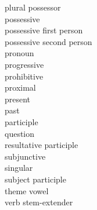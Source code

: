 \begin{multicols}{2}
\begin{tabbing}
\plposs \> plural possessor\\
\poss \> possessive\\
\possFsg \> possessive first person\\
\possSsg \> possessive second person\\
\pro \> pronoun\\
\prog \> progressive\\
\proh \> prohibitive\\
\prox \> proximal\\
\prs \> present\\
\pst \> past\\ 
\ptcp \> participle\\
\q \> question\\
\rptcp \> resultative participle\\
\sbjv \> subjunctive\\
\sg \> singular\\
\sptcp \> subject participle\\
\thgloss \> theme vowel\\
\vx \> verb stem-extender
\end{tabbing}
\end{multicols}
